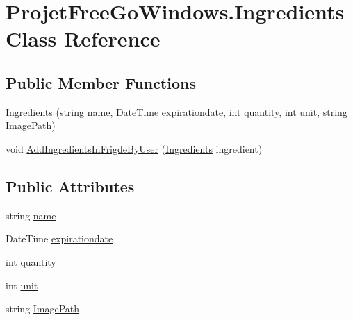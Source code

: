 \hypertarget{class_projet_free_go_windows_1_1_ingredients}{}\section{Projet\+Free\+Go\+Windows.\+Ingredients Class Reference}
\label{class_projet_free_go_windows_1_1_ingredients}
\subsection*{Public Member Functions}
\begin{DoxyCompactItemize}
\item 
\hyperlink{class_projet_free_go_windows_1_1_ingredients_a46b82578c5aca271a67f51d2da65a14e}{Ingredients} (string \hyperlink{class_projet_free_go_windows_1_1_ingredients_a72c56e5b3b00147b17164eeae3e98457}{name}, Date\+Time \hyperlink{class_projet_free_go_windows_1_1_ingredients_a112771411ceefffbfc8e4e96855f8aa7}{expirationdate}, int \hyperlink{class_projet_free_go_windows_1_1_ingredients_a579dcf0c869c7d4299cbc86fe4ceb396}{quantity}, int \hyperlink{class_projet_free_go_windows_1_1_ingredients_aff450c1c13460e62822874c7bdd2d79d}{unit}, string \hyperlink{class_projet_free_go_windows_1_1_ingredients_a0ac9c2f9850779e4be80ae6113e05a77}{Image\+Path})
\item 
void \hyperlink{class_projet_free_go_windows_1_1_ingredients_a39b077484383edd1cf9b057cc9f9e561}{Add\+Ingredients\+In\+Frigde\+By\+User} (\hyperlink{class_projet_free_go_windows_1_1_ingredients}{Ingredients} ingredient)
\end{DoxyCompactItemize}
\subsection*{Public Attributes}
\begin{DoxyCompactItemize}
\item 
string \hyperlink{class_projet_free_go_windows_1_1_ingredients_a72c56e5b3b00147b17164eeae3e98457}{name}
\item 
Date\+Time \hyperlink{class_projet_free_go_windows_1_1_ingredients_a112771411ceefffbfc8e4e96855f8aa7}{expirationdate}
\item 
int \hyperlink{class_projet_free_go_windows_1_1_ingredients_a579dcf0c869c7d4299cbc86fe4ceb396}{quantity}
\item 
int \hyperlink{class_projet_free_go_windows_1_1_ingredients_aff450c1c13460e62822874c7bdd2d79d}{unit}
\item 
string \hyperlink{class_projet_free_go_windows_1_1_ingredients_a0ac9c2f9850779e4be80ae6113e05a77}{Image\+Path}
\end{DoxyCompactItemize}


